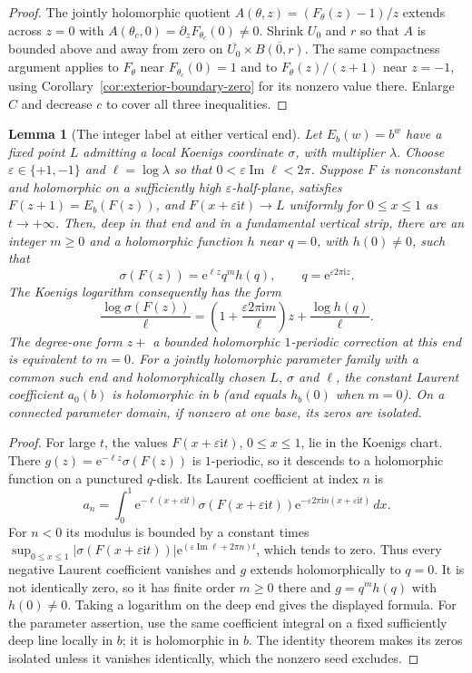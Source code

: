 \documentclass[11pt]{amsart}
\newtheorem{lemma}[theorem]{Lemma}
\theoremstyle{definition}
\newcommand{\eee}{\mathrm{e}}
\newcommand{\ii}{\mathrm{i}}
\begin{document}
\begin{proof}
The jointly holomorphic quotient
$A(\theta,z)=(F_\theta(z)-1)/z$ extends across $z=0$ with
$A(\theta_c,0)=\partial_zF_{\theta_c}(0)\ne0$.
Shrink $U_0$ and $r$ so that $A$ is bounded above and away from
zero on $\overline{U_0}\times\overline{B(0,r)}$.
The same compactness argument applies to $F_\theta$ near
$F_{\theta_c}(0)=1$ and to
$F_\theta(z)/(z+1)$ near $z=-1$, using
Corollary~\ref{cor:exterior-boundary-zero} for its nonzero value there.
Enlarge $C$ and decrease $c$ to cover all three inequalities.
\end{proof}

\begin{lemma}[The integer label at either vertical end]\label{lem:end-spectrum}
Let $E_b(w)=b^w$ have a fixed point $L$ admitting a local Koenigs
coordinate $\sigma$, with multiplier $\lambda$.  Choose
$\varepsilon\in\{+1,-1\}$ and $\ell=\log\lambda$ so that
$0<\varepsilon\operatorname{Im}\ell<2\pi$.
Suppose $F$ is nonconstant and holomorphic on a sufficiently high
$\varepsilon$-half-plane, satisfies $F(z+1)=E_b(F(z))$, and
$F(x+\varepsilon\ii t)\to L$ uniformly for $0\le x\le1$ as
$t\to+\infty$.  Then, deep in that end and in a fundamental vertical
strip, there are an integer $m\ge0$ and a holomorphic function $h$
near $q=0$, with $h(0)\ne0$, such that
\[
 \sigma(F(z))=\eee^{\ell z}q^m h(q),\qquad
 q=\eee^{\varepsilon2\pi\ii z}.
\]
The Koenigs logarithm consequently has the form
\[
 \frac{\log\sigma(F(z))}{\ell}
 =\left(1+\frac{\varepsilon2\pi\ii m}{\ell}\right)z
  +\frac{\log h(q)}{\ell}.
\]
The degree-one form $z+$ a bounded holomorphic $1$-periodic
correction at this end is equivalent to $m=0$.
For a jointly holomorphic parameter family with a common such end
and holomorphically chosen $L$, $\sigma$ and $\ell$, the constant
Laurent coefficient $a_0(b)$ is holomorphic in $b$ (and equals
$h_b(0)$ when $m=0$).  On a connected parameter domain, if nonzero
at one base, its zeros are isolated.
\end{lemma}

\begin{proof}
For large $t$, the values $F(x+\varepsilon\ii t)$, $0\le x\le1$,
lie in the Koenigs chart.  There
$g(z)=\eee^{-\ell z}\sigma(F(z))$ is $1$-periodic,
so it descends to a holomorphic function on a punctured $q$-disk.
Its Laurent coefficient at index $n$ is
\[
 a_n=\int_0^1\eee^{-\ell(x+\varepsilon\ii t)}
       \sigma(F(x+\varepsilon\ii t))
       \eee^{-\varepsilon2\pi\ii n(x+\varepsilon\ii t)}\,dx.
\]
For $n<0$ its modulus is bounded by a constant times
$\sup_{0\le x\le1}|\sigma(F(x+\varepsilon\ii t))|
 \eee^{(\varepsilon\operatorname{Im}\ell+2\pi n)t}$, which tends to zero.
Thus every negative Laurent coefficient vanishes and $g$ extends
holomorphically to $q=0$.  It is not identically zero, so it has
finite order $m\ge0$ there and $g=q^m h(q)$ with $h(0)\ne0$.
Taking a logarithm on the deep end gives the displayed formula.
For the parameter assertion, use the same coefficient integral on a
fixed sufficiently deep line locally in $b$; it is holomorphic in
$b$.  The identity theorem makes its zeros isolated unless it
vanishes identically, which the nonzero seed excludes.
\end{proof}
\end{document}
